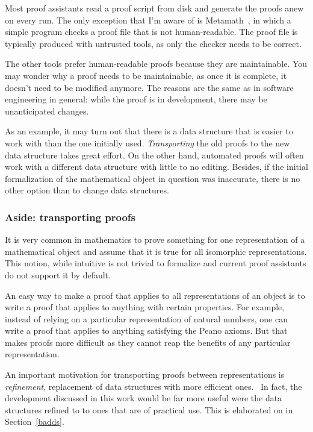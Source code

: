 \documentclass[english, 12pt, a4paper, sci, a-1b, online]{aaltothesis}
\begin{document}
Most proof assistants read a proof script from disk and generate the proofs anew on every run. The only exception that I'm aware of is Metamath~\cite{MMZero}, in which a simple program checks a proof file that is not human-readable. The proof file is typically produced with untrusted tools, as only the checker needs to be correct.

The other tools prefer human-readable proofs because they are maintainable. You may wonder why a proof needs to be maintainable, as once it is complete, it doesn't need to be modified anymore. The reasons are the same as in software engineering in general: while the proof is in development, there may be unanticipated changes.

As an example, it may turn out that there is a data structure that is easier to work with than the one initially used. \emph{Transporting} the old proofs to the new data structure takes great effort. On the other hand, automated proofs will often work with a different data structure with little to no editing. Besides, if the initial formalization of the mathematical object in question was inaccurate, there is no other option than to change data structures.

\subsubsection{Aside: transporting proofs}\label{transport}

It is very common in mathematics to prove something for one representation of a mathematical object and assume that it is true for all isomorphic representations. This notion, while intuitive is not trivial to formalize and current proof assistants do not support it by default.

An easy way to make a proof that applies to all representations of an object is to write a proof that applies to anything with certain properties. For example, instead of relying on a particular representation of natural numbers, one can write a proof that applies to anything satisfying the Peano axioms. But that makes proofs more difficult as they cannot reap the benefits of any particular representation.~\cite{transferAlongIso}

An important motivation for transporting proofs between representations is \emph{refinement}, replacement of data structures with more efficient ones.~\cite{refinementsFF} In fact, the development discussed in this work would be far more useful were the data structures refined to to ones that are of practical use. This is elaborated on in Section~\ref{badds}.
\end{document}
